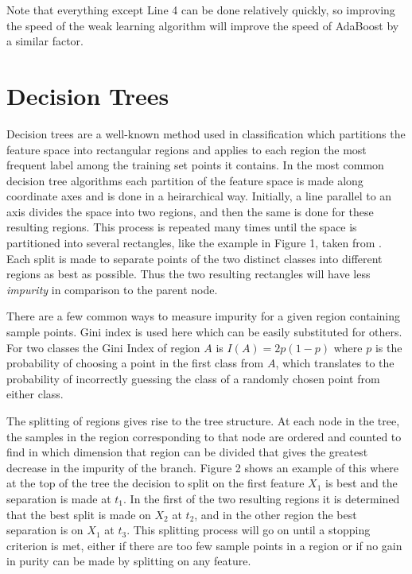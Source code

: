 \documentclass[12pt]{article}
\begin{document}
Note that everything except Line 4 can be done relatively quickly, so improving
the speed of the weak learning algorithm will improve the speed of AdaBoost by
a similar factor. 

\section{Decision Trees}

\indent Decision trees are a well-known method used in classification which
partitions the feature space into rectangular regions and applies to each
region the most frequent label among the training set points it contains. In
the most common decision tree algorithms each partition of the feature space is
made along coordinate axes and is done in a heirarchical way. Initially, a line
parallel to an axis divides the space into two regions, and then the same is
done for these resulting regions. This process is repeated many times until the
space is partitioned into several rectangles, like the example in Figure 1, taken from
\cite{HTF}. Each split is made to separate points of the two distinct classes
into different regions as best as possible. Thus the two resulting rectangles
will have less {\it impurity} in comparison to the parent node.


There are a few common ways to measure impurity for a given region containing
sample points. Gini index is used here which can be easily substituted for
others. For two classes the Gini Index of region $A$ is $I(A) = 2p(1-p)$ where
$p$ is the probability of choosing a point in the first class from $A$, which
translates to the probability of incorrectly guessing the class of a randomly
chosen point from either class.

The splitting of regions gives rise to the tree structure. At each node in the
tree, the samples in the region corresponding to that node are ordered and
counted to find in which dimension that region can be divided that gives the
greatest decrease in the impurity of the branch. Figure 2 shows an example of
this where at the top of the tree the decision to split on the first feature
$X_1$ is best and the separation is made at $t_1$. In the first of the two
resulting regions it is determined that the best split is made on $X_2$ at
$t_2$, and in the other region the best separation is on $X_1$ at $t_3$. This
splitting process will go on until a stopping criterion is met, either if there
are too few sample points in a region or if no gain in purity can be made by
splitting on any feature.
\end{document}
